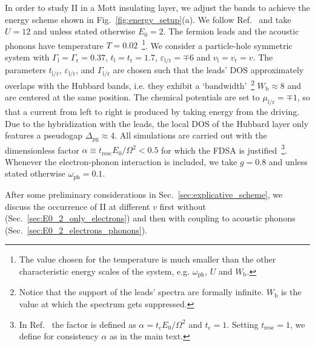 \documentclass[aps,prb,groupedaddress,showpacs,twocolumn,superscriptaddress,10pt]{revtex4-2}
\begin{document}
In order to study II in a Mott insulating layer, we adjust the bands to achieve the energy scheme shown in Fig.~\ref{fig:energy_setup}(a). We follow Ref.~\cite{so.do.18} and take $U=12$ and unless stated otherwise $E_0=2$. The fermion leads and the acoustic phonons have temperature $T=0.02$~\footnote{The value chosen for the temperature is much smaller than the other characteristic energy scales of the system, e.g. $\omega_{\text{ph}}$, $U$ and $W_{\text{b}}$.}. We consider a particle-hole symmetric system with $\Gamma_{\text{l}}=\Gamma_{\text{r}}=0.37$, $t_{\text{l}}=t_{\text{r}}=1.7$, $\varepsilon_{\text{l}/\text{r}}=\mp 6$ and $v_{\text{l}}=v_{\text{r}}=v$. The parameters $t_{\text{l/r}}$, $\varepsilon_{\text{l/r}}$, and  $\Gamma_{\text{l/r}}$ are chosen such that the leads' DOS approximately overlaps with the Hubbard bands, i.e. they exhibit a \textquoteleft bandwidth\textquoteright~\footnote{Notice that the support of the leads' spectra are formally infinite. $W_{\text{b}}$ is the value at which the spectrum gets  suppressed.} $W_{\text{b}}\approx 8$ and are centered at the same position. The chemical potentials are set to $\mu_{\text{l}/\text{r}} =\mp 1$, so that a current from left to right is produced by taking energy from the driving. Due to the hybridization with the leads, the local DOS of the Hubbard layer only features a pseudogap
 $\Delta_{\text{pg}} \approx 4$. All simulations are carried out with the dimensionless factor $\alpha\equiv t_{\text{resc}}E_0/\Omega^{2}<0.5$ for which the FDSA is justified~\footnote{In Ref.~\cite{so.do.18} the factor is defined as $\alpha=t_{c}E_0/\Omega^{2}$ and $t_{\text{c}}=1$. Setting $t_{\text{resc}}=1$, we define for consistency $\alpha$ as in the main text.}. Whenever the electron-phonon interaction is included, we take $g=0.8$ and unless stated otherwise $\omega_{\text{ph}}=0.1$.  

After some preliminary considerations in Sec.~\ref{sec:explicative_scheme}, we discuss the occurrence of II at different $v$ first without (Sec.~\ref{sec:E0_2_only_electrons}) and then with coupling to acoustic phonons (Sec.~\ref{sec:E0_2_electrons_phonons}). 
\end{document}
